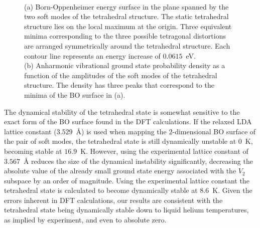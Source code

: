 \documentclass[aps,showpacs,prb,reprint,superscriptaddress,longbibliography]{revtex4-1}
\begin{document}
\begin{figure}
\begin{center}
\\
\end{center}
\caption{(a) Born-Oppenheimer energy surface in the plane spanned
  by the two soft modes of the tetrahedral structure. The
  static tetrahedral structure lies on the local maximum at the
  origin. Three equivalent minima corresponding to the three possible
  tetragonal distortions are arranged symmetrically around the
  tetrahedral structure. Each contour line represents an energy
  increase of $0.0615$~eV.\\
  (b) Anharmonic vibrational ground state probability density as a function
  of the amplitudes of the soft modes of the tetrahedral
  structure. The density has three peaks that correspond to the
  minima of the BO surface in (a).
 }
\label{fig:CoupledSurfWavefn}
\end{figure}

The dynamical stability of the tetrahedral state is somewhat sensitive
to the exact form of the BO surface found in the DFT calculations. If
the relaxed LDA lattice constant ($3.529$~\r{A}) is used when mapping
the $2$-dimensional BO surface of the pair of soft modes, the
tetrahedral state is still dynamically unstable at $0$~K, becoming
stable at $16.9$~K.  However, using the experimental lattice constant
of $3.567$~\r{A}\cite{madelung_semiconductors_1996} reduces the size
of the dynamical instability significantly, decreasing the absolute
value of the already small ground state energy associated with the
$V_2$ subspace by an order of magnitude.  Using the experimental
lattice constant the tetrahedral state is calculated to become
dynamically stable at $8.6$~K. Given the errors inherent in DFT
calculations, our results are consistent with the tetrahedral state
being dynamically stable down to liquid helium temperatures, as
implied by experiment,\cite{lannoo_optical_1968} and even to absolute
zero.
\end{document}
